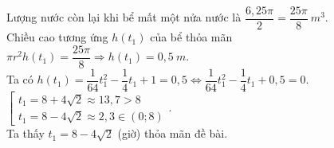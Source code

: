 \begin{ex}
{\begin{itemchoice}
			\itemch Lượng nước còn lại khi bể mất một nửa nước là $\dfrac{6,25\pi}{2} = \dfrac{25\pi}{8}\ m^3$. \\Chiều cao tương ứng $h(t_1)$ của bể thỏa mãn $\pi r^2 h(t_1) = \dfrac{25\pi}{8} \Rightarrow h(t_1) = 0,5\ m$.\\ Ta có $h(t_1) = \dfrac{1}{64}t_1^2 - \dfrac{1}{4}t_1 + 1 = 0,5 \Leftrightarrow \dfrac{1}{64}t_1^2 - \dfrac{1}{4}t_1 + 0,5 = 0$. $\left[ \begin{array}{l} t_1 = 8 + 4\sqrt{2} \approx 13,7 > 8 \\ t_1 = 8 - 4\sqrt{2} \approx 2,3 \in (0; 8) \end{array} \right.$. \\Ta thấy $t_1 = 8 - 4\sqrt{2}$ (giờ) thỏa mãn đề bài.
		\end{itemchoice}
	}
\end{ex}
